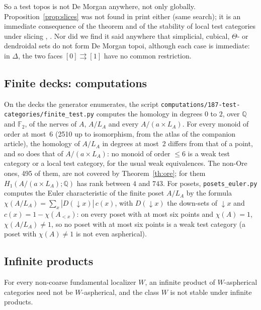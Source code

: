 So a test topos is not De Morgan anywhere, not only globally. Proposition~\ref{prop:slices} was not found in print either (same search); it is an immediate consequence of the theorem and of the stability of local test categories under slicing \cite[Prop.~4.1.14 (v)]{cisinski-308}, \cite[Rem.~1.5.4 b)]{maltsiniotis-301}. Nor did we find it said anywhere that simplicial, cubical, $\Theta$- or dendroidal sets do not form De Morgan topoi, although each case is immediate: in $\Delta$, the two faces $[0]\rightrightarrows[1]$ have no common restriction.

\subsection{Finite decks: computations}

On the decks the generator enumerates, the script \nolinkurl{computations/187-test-categories/finite_test.py} computes the homology in degrees $0$ to $2$, over $\mathbb Q$ and $\mathbb F_2$, of the nerves of $A$, $A/L_A$ and every $A/(a\times L_A)$. For every monoid of order at most~6 (2510 up to isomorphism, from the atlas of the companion article), the homology of $A/L_A$ in degrees at most~2 differs from that of a point, and so does that of $A/(a\times L_A)$: no monoid of order $\le 6$ is a weak test category or a local test category, for the usual weak equivalences. The non-Ore ones, 495 of them, are not covered by Theorem~\ref{th:ore}; for them $H_1(A/(a\times L_A);\mathbb Q)$ has rank between $4$ and $743$. For posets, \nolinkurl{posets_euler.py} computes the Euler characteristic of the finite poset $A/L_A$ by the formula $\chi(A/L_A) = \sum_x |D(\downarrow x)|\,c(x)$, with $D(\downarrow x)$ the down-sets of $\downarrow x$ and $c(x) = 1-\chi(A_{<x})$: on every poset with at most six points and $\chi(A)=1$, $\chi(A/L_A)\ne1$, so no poset with at most six points is a weak test category (a poset with $\chi(A)\ne1$ is not even aspherical).


\subsection{Infinite products}

\begin{proposition}\label{prop:products}
For every non-coarse fundamental localizer $W$, an infinite product of $W$-aspherical categories need not be $W$-aspherical, and the class $W$ is not stable under infinite products.
\end{proposition}

